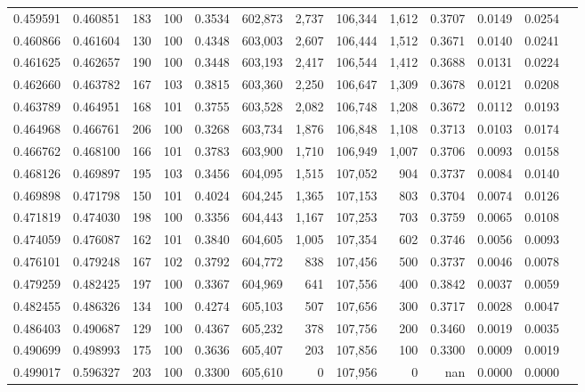 \begin{tabular}{rrrrrrrrrrrrr}
0.459591 & 0.460851 &   183 & 100 &                                     0.3534 & 602,873 &   2,737 & 106,344 &   1,612 & 0.3707 & 0.0149 & 0.0254 \\
0.460866 & 0.461604 &   130 & 100 &                                     0.4348 & 603,003 &   2,607 & 106,444 &   1,512 & 0.3671 & 0.0140 & 0.0241 \\
0.461625 & 0.462657 &   190 & 100 &                                     0.3448 & 603,193 &   2,417 & 106,544 &   1,412 & 0.3688 & 0.0131 & 0.0224 \\
0.462660 & 0.463782 &   167 & 103 &                                     0.3815 & 603,360 &   2,250 & 106,647 &   1,309 & 0.3678 & 0.0121 & 0.0208 \\
0.463789 & 0.464951 &   168 & 101 &                                     0.3755 & 603,528 &   2,082 & 106,748 &   1,208 & 0.3672 & 0.0112 & 0.0193 \\
0.464968 & 0.466761 &   206 & 100 &                                     0.3268 & 603,734 &   1,876 & 106,848 &   1,108 & 0.3713 & 0.0103 & 0.0174 \\
0.466762 & 0.468100 &   166 & 101 &                                     0.3783 & 603,900 &   1,710 & 106,949 &   1,007 & 0.3706 & 0.0093 & 0.0158 \\
0.468126 & 0.469897 &   195 & 103 &                                     0.3456 & 604,095 &   1,515 & 107,052 &     904 & 0.3737 & 0.0084 & 0.0140 \\
0.469898 & 0.471798 &   150 & 101 &                                     0.4024 & 604,245 &   1,365 & 107,153 &     803 & 0.3704 & 0.0074 & 0.0126 \\
0.471819 & 0.474030 &   198 & 100 &                                     0.3356 & 604,443 &   1,167 & 107,253 &     703 & 0.3759 & 0.0065 & 0.0108 \\
0.474059 & 0.476087 &   162 & 101 &                                     0.3840 & 604,605 &   1,005 & 107,354 &     602 & 0.3746 & 0.0056 & 0.0093 \\
0.476101 & 0.479248 &   167 & 102 &                                     0.3792 & 604,772 &     838 & 107,456 &     500 & 0.3737 & 0.0046 & 0.0078 \\
0.479259 & 0.482425 &   197 & 100 &                                     0.3367 & 604,969 &     641 & 107,556 &     400 & 0.3842 & 0.0037 & 0.0059 \\
0.482455 & 0.486326 &   134 & 100 &                                     0.4274 & 605,103 &     507 & 107,656 &     300 & 0.3717 & 0.0028 & 0.0047 \\
0.486403 & 0.490687 &   129 & 100 &                                     0.4367 & 605,232 &     378 & 107,756 &     200 & 0.3460 & 0.0019 & 0.0035 \\
0.490699 & 0.498993 &   175 & 100 &                                     0.3636 & 605,407 &     203 & 107,856 &     100 & 0.3300 & 0.0009 & 0.0019 \\
0.499017 & 0.596327 &   203 & 100 &                                     0.3300 & 605,610 &       0 & 107,956 &       0 &    nan & 0.0000 & 0.0000 \\
\bottomrule
\end{tabular}
